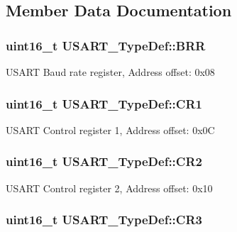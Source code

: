 \subsection{Member Data Documentation}
\hypertarget{struct_u_s_a_r_t___type_def_a2044eb2a0a8a731400d309741bceb2f7}{
\subsubsection[{B\-R\-R}]{ uint16\-\_\-t U\-S\-A\-R\-T\-\_\-\-Type\-Def\-::\-B\-R\-R}}\label{struct_u_s_a_r_t___type_def_a2044eb2a0a8a731400d309741bceb2f7}
U\-S\-A\-R\-T Baud rate register, Address offset\-: 0x08 \hypertarget{struct_u_s_a_r_t___type_def_a5de50313b1437f7f926093f00902d37a}{
\subsubsection[{C\-R1}]{ uint16\-\_\-t U\-S\-A\-R\-T\-\_\-\-Type\-Def\-::\-C\-R1}}\label{struct_u_s_a_r_t___type_def_a5de50313b1437f7f926093f00902d37a}
U\-S\-A\-R\-T Control register 1, Address offset\-: 0x0\-C \hypertarget{struct_u_s_a_r_t___type_def_a2a494156d185762e4596696796c393bc}{
\subsubsection[{C\-R2}]{ uint16\-\_\-t U\-S\-A\-R\-T\-\_\-\-Type\-Def\-::\-C\-R2}}\label{struct_u_s_a_r_t___type_def_a2a494156d185762e4596696796c393bc}
U\-S\-A\-R\-T Control register 2, Address offset\-: 0x10 \hypertarget{struct_u_s_a_r_t___type_def_a2b9d1df38cb1d745305c8190a8707a0f}{
\subsubsection[{C\-R3}]{ uint16\-\_\-t U\-S\-A\-R\-T\-\_\-\-Type\-Def\-::\-C\-R3}}\label{struct_u_s_a_r_t___type_def_a2b9d1df38cb1d745305c8190a8707a0f}
